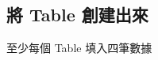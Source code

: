 \documentclass[12pt, a4paper]{report}
\begin{document}
\begin{figure}[H] %
    \centering %
\end{figure}

\subsection{將 Table 創建出來}

{至少每個 Table 填入四筆數據}

\begin{figure}[H] %
    \centering %
\end{figure}
\end{document}
